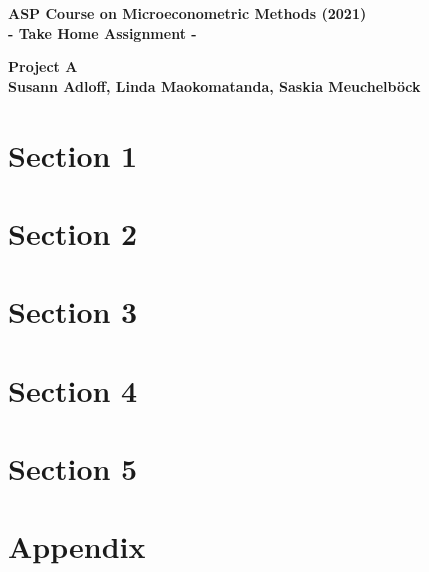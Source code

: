 \documentclass[11pt,a4paper,leqno]{article}
\begin{document}
 \begin{center}
	\begin{LARGE}
		\textbf{
			ASP Course on Microeconometric Methods (2021)\\
			 - Take Home Assignment -\\
		}
	\end{LARGE}
	\vspace{0.2cm}
	{\large \textbf{Project A}} \\\vspace{0.2cm}
	{\large \textbf{Susann Adloff, Linda Maokomatanda, Saskia Meuchelböck}} \vspace{0.2cm}
\end{center}

\section*{Section 1}


\section*{Section 2} 


\section*{Section 3} 

\clearpage

\section*{Section 4} 


\section*{Section 5} 



\clearpage



\appendix
\section*{Appendix}


\end{document}
